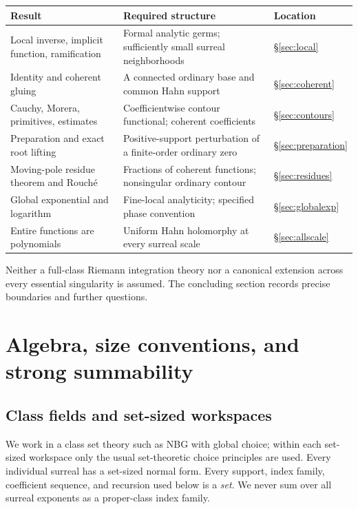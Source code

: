\documentclass[11pt,letterpaper]{article}
\theoremstyle{definition}
\theoremstyle{remark}
\numberwithin{equation}{section}
\begin{document}
\begin{center}\small
\begin{tabular}{@{}L{0.27\textwidth}L{0.43\textwidth}L{0.19\textwidth}@{}}
\toprule
Result & Required structure & Location\\
\midrule
Local inverse, implicit function, ramification & Formal analytic germs; sufficiently small surreal neighborhoods & \S\ref{sec:local}\\
Identity and coherent gluing & A connected ordinary base and common Hahn support & \S\ref{sec:coherent}\\
Cauchy, Morera, primitives, estimates & Coefficientwise contour functional; coherent coefficients & \S\ref{sec:contours}\\
Preparation and exact root lifting & Positive-support perturbation of a finite-order ordinary zero & \S\ref{sec:preparation}\\
Moving-pole residue theorem and Rouch\'e & Fractions of coherent functions; nonsingular ordinary contour & \S\ref{sec:residues}\\
Global exponential and logarithm & Fine-local analyticity; specified phase convention & \S\ref{sec:globalexp}\\
Entire functions are polynomials & Uniform Hahn holomorphy at every surreal scale & \S\ref{sec:allscale}\\
\bottomrule
\end{tabular}
\end{center}
Neither a full-class Riemann integration theory nor a canonical extension across every essential singularity is assumed. The concluding section records precise boundaries and further questions.

\section{Algebra, size conventions, and strong summability}\label{sec:foundations}
\subsection{Class fields and set-sized workspaces}
We work in a class set theory such as NBG with global choice; within each set-sized workspace only the usual set-theoretic choice principles are used. Every individual surreal has a set-sized normal form. Every support, index family, coefficient sequence, and recursion used below is a \emph{set}. We never sum over all surreal exponents as a proper-class index family.
\end{document}
